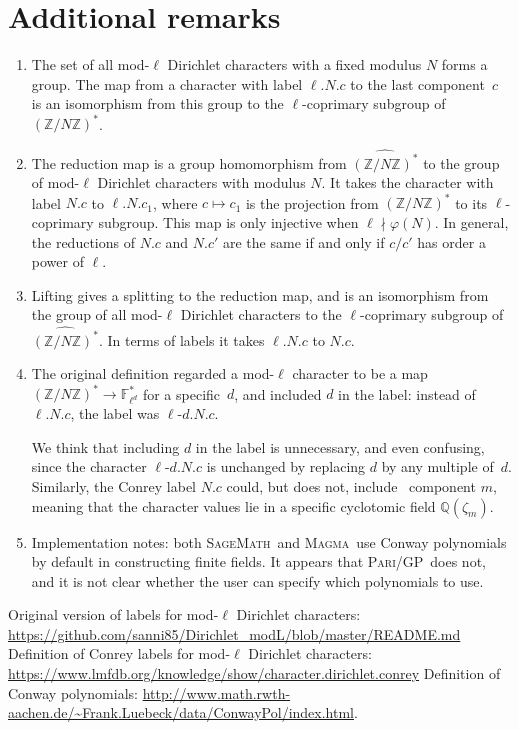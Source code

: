 \documentclass[a4paper, 10pt]{amsart}
\def\Z{{\mathbb Z}}
\def\Q{{\mathbb Q}}
\def\Fld{{\mathbb F}_{\ell^d}}
\def\ZNs{(\Z/N\Z)^*}
\def\ZNsh{\widehat{\ZNs}}
\newcommand{\software}[1]{\textsc{#1}{}}
\newcommand{\Sage}{\software{SageMath}}
\newcommand{\Magma}{\software{Magma}}
\newcommand{\GP}{\software{Pari/GP}}
\newcommand{\CLab}[2]{$#1.#2$}
\newcommand{\DLab}[3]{$#1.#2.#3$}
\newcommand{\oldDLab}[4]{$#1$-$#2.#3.#4$}
\begin{document}
\section{Additional remarks}
\begin{enumerate}
\item
  The set of all mod-$\ell$ Dirichlet characters with a fixed modulus
  $N$ forms a group.  The map from a character with label
  \DLab{\ell}{N}{c} to the last component~$c$ is an isomorphism from
  this group to the $\ell$-coprimary subgroup of $\ZNs$.
\item
  The reduction map is a group homomorphism from $\ZNsh$ to the group
  of mod-$\ell$ Dirichlet characters with modulus $N$.  It takes the
  character with label \CLab{N}{c} to \DLab{\ell}{N}{c_1}, where
  $c\mapsto c_1$ is the projection from $\ZNs$ to its $\ell$-coprimary
  subgroup.  This map is only injective when $\ell\nmid\varphi(N)$.
  In general, the reductions of \CLab{N}{c} and \CLab{N}{c'} are the
  same if and only if $c/c'$ has order a power of $\ell$.
\item
  Lifting gives a splitting to the reduction map, and is an
  isomorphism from the group of all mod-$\ell$ Dirichlet characters to
  the $\ell$-coprimary subgroup of $\ZNsh$. In terms of labels it
  takes \DLab{\ell}{N}{c} to \CLab{N}{c}.
\item
  The original definition regarded a mod-$\ell$ character to be a map
  $\ZNs\to\Fld^*$ for a specific~$d$, and included $d$ in the label:
  instead of \DLab{\ell}{N}{c}, the label was \oldDLab{\ell}{d}{N}{c}.

  We think that including $d$ in the label is unnecessary, and even
  confusing, since the character \oldDLab{\ell}{d}{N}{c} is unchanged
  by replacing $d$ by any multiple of~$d$.  Similarly, the Conrey
  label \CLab{N}{c} could, but does not, include \ component $m$,
  meaning that the character values lie in a specific cyclotomic field
  $\Q(\zeta_m)$.

\item
  Implementation notes: both \Sage\ and \Magma\ use Conway polynomials
  by default in constructing finite fields.  It appears that \GP\ does
  not, and it is not clear whether the user can specify which
  polynomials to use.
\end{enumerate}

\begin{thebibliography}{99}
 Original version of labels for mod-$\ell$ Dirichlet
  characters:
  \url{https://github.com/sanni85/Dirichlet_modL/blob/master/README.md}
  Definition of Conrey labels for mod-$\ell$ Dirichlet characters:
  \url{https://www.lmfdb.org/knowledge/show/character.dirichlet.conrey}
 Definition of Conway polynomials:
  \url{http://www.math.rwth-aachen.de/~Frank.Luebeck/data/ConwayPol/index.html}.
\end{thebibliography}
\end{document}
